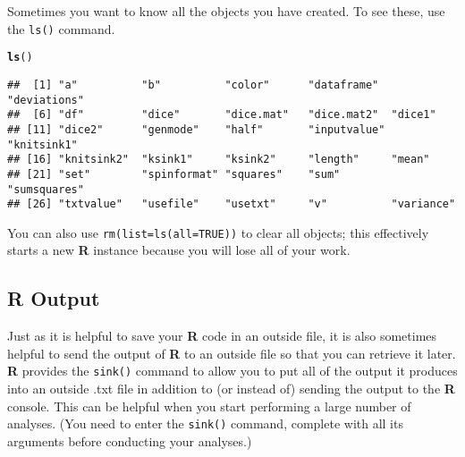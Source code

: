 \documentclass[12pt]{article}\usepackage[]{graphicx}\usepackage[]{color}
\makeatletter
\newcommand{\hlstd}[1]{\textcolor[rgb]{0.345,0.345,0.345}{#1}}%
\newcommand{\hlkwd}[1]{\textcolor[rgb]{0.737,0.353,0.396}{\textbf{#1}}}%
\newenvironment{kframe}{%
 \def\at@end@of@kframe{}%
 \ifinner\ifhmode%
  \def\at@end@of@kframe{\end{minipage}}%
  \begin{minipage}{\columnwidth}%
 \fi\fi%
 \def\FrameCommand##1{\hskip\@totalleftmargin \hskip-\fboxsep
 \colorbox{shadecolor}{##1}\hskip-\fboxsep
     \hskip-\linewidth \hskip-\@totalleftmargin \hskip\columnwidth}%
 \MakeFramed {\advance\hsize-\width
   \@totalleftmargin\z@ \linewidth\hsize
   \@setminipage}}%
 {\par\unskip\endMakeFramed%
 \at@end@of@kframe}
\newenvironment{knitrout}{}{} %
\makeatother
\begin{document}
Sometimes you want to know all the objects you have created. To see these, use the \verb|ls()| command.
\begin{knitrout}
\color{fgcolor}\begin{kframe}
\begin{alltt}
\hlkwd{ls}\hlstd{()}
\end{alltt}
\begin{verbatim}
##  [1] "a"          "b"          "color"      "dataframe"  "deviations"
##  [6] "df"         "dice"       "dice.mat"   "dice.mat2"  "dice1"     
## [11] "dice2"      "genmode"    "half"       "inputvalue" "knitsink1" 
## [16] "knitsink2"  "ksink1"     "ksink2"     "length"     "mean"      
## [21] "set"        "spinformat" "squares"    "sum"        "sumsquares"
## [26] "txtvalue"   "usefile"    "usetxt"     "v"          "variance"
\end{verbatim}
\end{kframe}
\end{knitrout}

You can also use \verb|rm(list=ls(all=TRUE))| to clear all objects; this effectively starts a new \textbf{R} instance because you will lose all of your work.

\subsection{\textbf{R} Output}
Just as it is helpful to save your \textbf{R} code in an outside file, it is also sometimes helpful to send the output of \textbf{R} to an outside file so that you can retrieve it later. \textbf{R} provides the \verb|sink()| command to allow you to put all of the output it produces into an outside .txt file in addition to (or instead of) sending the output to the \textbf{R} console. This can be helpful when you start performing a large number of analyses. (You need to enter the \verb|sink()| command, complete with all its arguments before conducting your analyses.)
\end{document}
